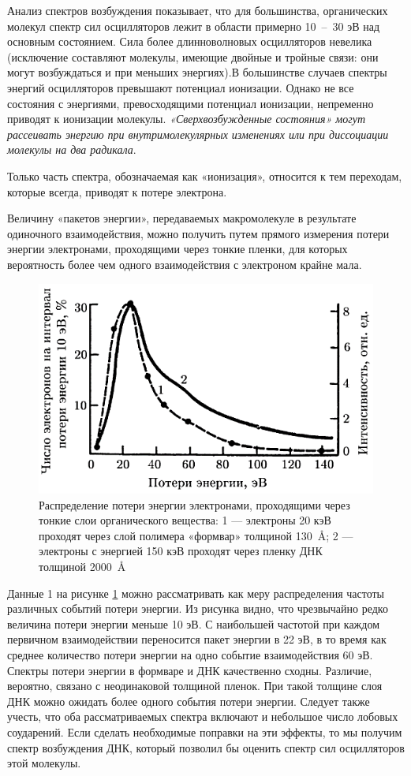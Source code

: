 \documentclass[a4paper, 14pt]{article}
\begin{document}
Анализ спектров возбуждения показывает, что для большинства, органических
молекул спектр сил осцилляторов лежит в области примерно 10~--~30 эВ над основным
состоянием. Сила более длинноволновых осцилляторов невелика (исключение
составляют молекулы, имеющие двойные и тройные связи: они могут возбуждаться и
при меньших энергиях).В большинстве случаев спектры энергий осцилляторов превышают потенциал
ионизации. Однако не все состояния с энергиями, превосходящими потенциал
ионизации, непременно приводят к ионизации молекулы. \textit{«Сверхвозбужденные
состояния» могут рассеивать энергию при внутримолекулярных изменениях или при
диссоциации молекулы на два радикала}.

Только часть спектра, обозначаемая как «ионизация», относится к тем
переходам, которые всегда, приводят к потере электрона.

Величину «пакетов энергии», передаваемых макромолекуле в результате
одиночного взаимодействия, можно получить путем прямого измерения потери
энергии электронами, проходящими через тонкие пленки, для которых вероятность
более чем одного взаимодействия с электроном крайне мала.
\begin{figure}[htbp]
    \centering
    \includegraphics[width=.6\textwidth]{energyLosses.png}
    \caption{Распределение потери энергии электронами, проходящими через тонкие слои органического вещества: 1 — электроны 20 кэВ проходят через слой полимера «формвар» толщиной 130~\AA; 2 — электроны с энергией 150 кэВ проходят через пленку ДНК толщиной 2000~\AA}
    \label{energyLosses}
\end{figure}
Данные 1 на рисунке \ref{energyLosses} можно рассматривать как меру распределения частоты
различных событий потери энергии. Из рисунка видно, что чрезвычайно редко
величина потери энергии меньше 10 эВ. С наибольшей частотой при каждом
первичном взаимодействии переносится пакет энергии в 22 эВ, в то время как среднее
количество потери энергии на одно событие взаимодействия 60 эВ.
Спектры потери энергии в формваре и ДНК качественно сходны. Различие,
вероятно, связано с неодинаковой толщиной пленок. При такой толщине слоя ДНК
можно ожидать более одного события потери энергии. Следует также учесть, что оба
рассматриваемых спектра включают и небольшое число лобовых соударений. Если сделать необходимые поправки на эти эффекты, то мы получим спектр возбуждения
ДНК, который позволил бы оценить спектр сил осцилляторов этой молекулы.
\end{document}
